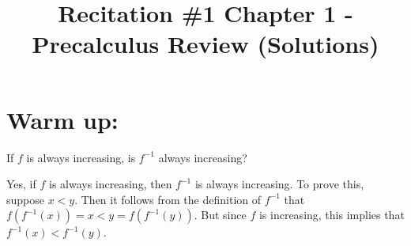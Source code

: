 \documentclass[nooutcomes]{ximera}
\title{Recitation \#1 Chapter 1 - Precalculus Review (Solutions)}
\begin{document}
\begin{abstract}		\end{abstract}
\maketitle

\section*{Warm up:}
   
If $f$ is always increasing, is $f^{-1}$ always increasing?

			 \begin{freeResponse}
			 
			Yes, if $f$ is always increasing, then $f^{-1}$ is always increasing.  To prove this, suppose $x < y$.  Then it follows from the definition of $f^{-1}$ that $f(f^{-1}(x)) = x < y =  f(f^{-1}(y))$.  But since $f$ is increasing, this implies that $f^{-1}(x)  < f^{-1}(y)$.
	
			\end{freeResponse}
\end{document}
